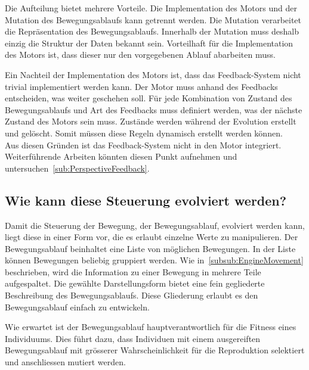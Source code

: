       \medskip

      Die Aufteilung bietet mehrere Vorteile.
      Die Implementation des Motors und der Mutation des Bewegungsablaufs kann getrennt werden.
      Die Mutation verarbeitet die Repräsentation des Bewegungsablaufs.
      Innerhalb der Mutation muss deshalb einzig die Struktur der Daten bekannt sein.
      Vorteilhaft für die Implementation des Motors ist, dass dieser nur den vorgegebenen Ablauf abarbeiten muss.

      \medskip

      Ein Nachteil der Implementation des Motors ist, dass das Feedback-System nicht trivial implementiert werden kann.
      Der Motor muss anhand des Feedbacks entscheiden, was weiter geschehen soll.
      Für jede Kombination von Zustand des Bewegungsablaufs und Art des Feedbacks muss definiert werden,
      was der nächste Zustand des Motors sein muss.
      Zustände werden während der Evolution erstellt und gelöscht.
      Somit müssen diese Regeln dynamisch erstellt werden können.
      \\
      Aus diesen Gründen ist das Feedback-System nicht in den Motor integriert.
      Weiterführende Arbeiten könnten diesen Punkt aufnehmen und untersuchen~\vref{sub:PerspectiveFeedback}.

    \subsection{Wie kann diese Steuerung evolviert werden?\label{sub:wieStEv}}

      Damit die Steuerung der Bewegung, der Bewegungsablauf, evolviert werden kann, liegt diese in einer Form vor,
      die es erlaubt einzelne Werte zu manipulieren.
      Der Bewegungsablauf beinhaltet eine Liste von möglichen Bewegungen.
      In der Liste können Bewegungen beliebig gruppiert werden.
      Wie in~\vref{subsub:EngineMovement} beschrieben,
      wird die Information zu einer Bewegung in mehrere Teile aufgespaltet.
      Die gewählte Darstellungsform bietet eine fein gegliederte Beschreibung des Bewegungsablaufs.
      Diese Gliederung erlaubt es den Bewegungsablauf einfach zu entwickeln.

      \medskip

      Wie erwartet ist der Bewegungsablauf hauptverantwortlich für die Fitness eines Individuums.
      Dies führt dazu, dass Individuen mit einem ausgereiften Bewegungsablauf mit grösserer Wahrscheinlichkeit
      für die Reproduktion selektiert und anschliessen mutiert werden.

